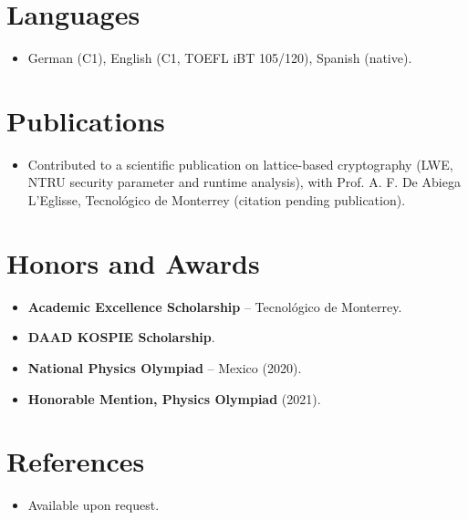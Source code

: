 \documentclass[11pt,a4paper,sans]{moderncv}
\begin{document}

\section{Languages}
\vspace{1pt}
\begin{itemize}
\item German (C1), English (C1, TOEFL iBT 105/120), Spanish (native).
\end{itemize}


\section{Publications}
\vspace{1pt}
\begin{itemize}
\item Contributed to a scientific publication on lattice-based cryptography (LWE, NTRU security parameter and runtime analysis), with Prof. A. F. De Abiega L'Eglisse, Tecnológico de Monterrey (citation pending publication).
\end{itemize}


\section{Honors and Awards}
\vspace{1pt}
\begin{itemize}
\item{\textbf{Academic Excellence Scholarship} -- Tecnológico de Monterrey.}
\item{\textbf{DAAD KOSPIE Scholarship}.}
\item{\textbf{National Physics Olympiad} -- Mexico (2020).}
\item{\textbf{Honorable Mention, Physics Olympiad} (2021).}
\end{itemize}


\section{References}
\vspace{1pt}
\begin{itemize}
\item{Available upon request.}
\end{itemize}
\end{document}
